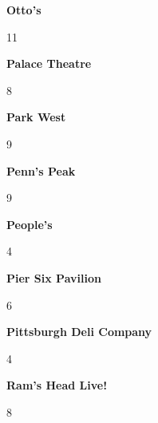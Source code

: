 \begin{center}\textbf{Otto's}\end{center}
\begin{center}11\end{center} 
\newline 
\begin{center}\textbf{Palace Theatre}\end{center}
\begin{center}8\end{center} 
\newline 
\begin{center}\textbf{Park West}\end{center}
\begin{center}9\end{center} 
\newline 
\begin{center}\textbf{Penn's Peak}\end{center}
\begin{center}9\end{center} 
\newline 
\begin{center}\textbf{People's}\end{center}
\begin{center}4\end{center} 
\newline 
\begin{center}\textbf{Pier Six Pavilion}\end{center}
\begin{center}6\end{center} 
\newline 
\begin{center}\textbf{Pittsburgh Deli Company}\end{center}
\begin{center}4\end{center} 
\newline 
\begin{center}\textbf{Ram's Head Live!}\end{center}
\begin{center}8\end{center} 
